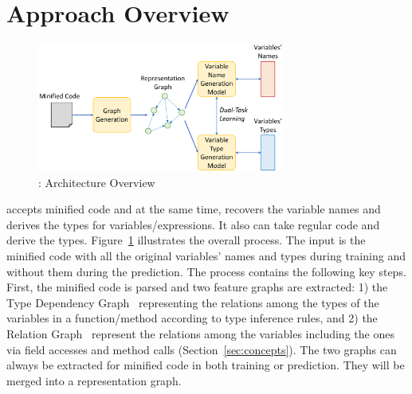 \section{Approach Overview}


\begin{figure}[t]
	\begin{center}
	  \includegraphics[width=3.2in]{figures/overview-2.png}
          \vspace{-8pt}
		\caption{{\tool}: Architecture Overview}
		\label{overview}
	\end{center}
\end{figure}



{\tool} accepts minified
code and at the same time, recovers the variable names and derives the
types for variables/expressions. It also can take regular code and
derive the types.
%
Figure~\ref{overview} illustrates the overall process. The input is
the minified code with all the original variables' names and types
during training and without them during the prediction.
%
The process contains the following key steps. First, the minified code
is parsed and two feature graphs are extracted: 1) the Type Dependency
Graph~\cite{HiTyper-icse22} representing the relations among the
types of the variables in a function/method according to type
inference rules, and 2) the Relation Graph~\cite{icse19} represent the
relations among the variables including the ones via field accesses
and method calls (Section~\ref{sec:concepts}). The two graphs can
always be extracted for minified code in both training or
prediction. They will be merged into a representation graph.

